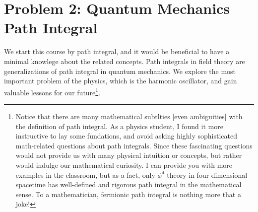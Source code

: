 \documentclass[11pt]{article}
\begin{document}
\section*{Problem 2: Quantum Mechanics Path Integral }
\begin{problem}
	We start this course by path integral, and it would be beneficial to have a minimal knowlege about the related concepts. Path integrals in field theory are generalizations of path integral in quantum mechanics. We explore the most important problem of the physics, which is the harmonic oscillator, and gain valuable lessons for our future\footnote{Notice that there are many mathematical subtlties [even ambiguities] with the definition of path integral. As a physics student, I found it more instructive to lay some fundations, and avoid asking highly sophisticated math-related questions about path integrals. Since these fascinating questions would not provide us with many physical intuition or concepts, but rather would indulge our mathematical curiosity. I can provide you with more examples in the classroom, but as a fact, only $\phi^4$ theory in four-dimensional spacetime has well-defined and rigorous path integral in the mathematical sense. To a mathematician, fermionic path integral is nothing more that a joke!}.
\end{problem}	
\end{document}
